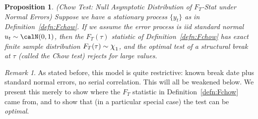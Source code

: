 \documentclass[12pt]{article}
\theoremstyle{plain}
\newtheorem{prop}[thm]{Proposition}
\theoremstyle{definition}
\theoremstyle{remark}
\newtheorem*{rmk}{Remark}
\newcommand*{\Chi}{\mbox{\large$\chi$}} %
\begin{document}
\begin{prop}
\emph{(Chow Test: Null Asymptotic Distribution of $F_T$-Stat under Normal Errors)}
Suppose we have a stationary process $\{y_t\}$ as in
Definition~\ref{defn:Fchow}. If we assume the error process is iid
standard normal $u_t \sim\calN(0,1)$,
then the $F_T(\tau)$ statistic of Definition~\ref{defn:Fchow}
has exact finite sample distribution $F_T(\tau)\sim \Chi_1$, and the
optimal test of a structural break at $\tau$ (called the
\emph{Chow test}) rejects for large values.
\end{prop}
\begin{rmk}
As stated before, this model is quite restrictive: known break date plus
standard normal errors, no serial correlation.
This will all be weakened below.
We present this merely to show where the $F_T$ statistic in
Definition~\ref{defn:Fchow} came from, and to show that (in a particular
special case) the test can be \emph{optimal}.
\end{rmk}
\end{document}
